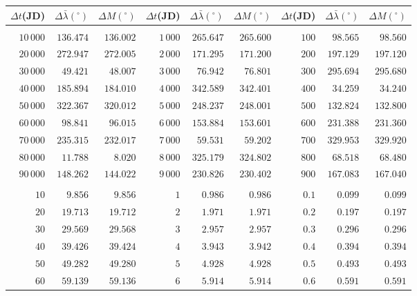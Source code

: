 \begin{table}[!h]
\centering
\vspace{0.25cm}
\begin{tabular}{rrr|rrr|rrr}
$\Delta t$(JD)& $\Delta\bar{\lambda}(^\circ)$ &  $\Delta M(^\circ)$ & $\Delta t$(JD)& $\Delta \bar{\lambda}(^\circ)$ & $\Delta M(^\circ)$ &$\Delta t$(JD)& $\Delta \bar{\lambda}(^\circ)$ & $\Delta M(^\circ)$\\ \hline
&&&&&&&&\\[-1.75ex]
$10\,000$ & $136.474$ & $136.002$ & $1\,000$ & $265.647$ & $265.600$& $100$ &  $98.565$ &  $98.560$\\
$20\,000$ & $272.947$ & $272.005$ & $2\,000$ & $171.295$ & $171.200$ & $200$ & $197.129$ & $197.120$\\
$30\,000$ &  $49.421$ &  $48.007$ & $3\,000$ &  $76.942$ &  $76.801$ & $300$ & $295.694$ & $295.680$\\
$40\,000$ & $185.894$ & $184.010$ & $4\,000$ & $342.589$ & $342.401$ & $400$ &  $34.259$ &  $34.240$\\
$50\,000$ & $322.367$ & $320.012$ & $5\,000$ & $248.237$ & $248.001$ & $500$ & $132.824$ & $132.800$\\
$60\,000$ &  $98.841$ &  $96.015$ & $6\,000$ & $153.884$ & $153.601$ & $600$ & $231.388$ & $231.360$\\
$70\,000$ & $235.315$ & $232.017$ & $7\,000$ &  $59.531$ &  $59.202$ & $700$ & $329.953$ & $329.920$\\
$80\,000$ &  $11.788$ &   $8.020$ & $8\,000$ & $325.179$ & $324.802$ & $800$ &  $68.518$ &  $68.480$\\
$90\,000$ & $148.262$ & $144.022$ & $9\,000$ & $230.826$ & $230.402$ & $900$ & $167.083$ & $167.040$\\
&&&&&&&&\\
$10$ &   $9.856$ &   $9.856$ & $1$ &   $0.986$ &   $0.986$ & $0.1$ &   $0.099$ &   $0.099$\\
$20$ &  $19.713$ &  $19.712$ & $2$ &   $1.971$ &   $1.971$ & $0.2$ &   $0.197$ &   $0.197$\\
$30$ &  $29.569$ &  $29.568$ & $3$ &   $2.957$ &   $2.957$ & $0.3$ &   $0.296$ &   $0.296$\\
$40$ &  $39.426$ &  $39.424$ & $4$ &   $3.943$ &   $3.942$ & $0.4$ &   $0.394$ &   $0.394$\\
$50$ &  $49.282$ &  $49.280$ & $5$ &   $4.928$ &   $4.928$ & $0.5$ &   $0.493$ &   $0.493$\\
$60$ &  $59.139$ &  $59.136$ & $6$ &   $5.914$ &   $5.914$ & $0.6$ &   $0.591$ &   $0.591$\\

\end{tabular}
\end{table}
